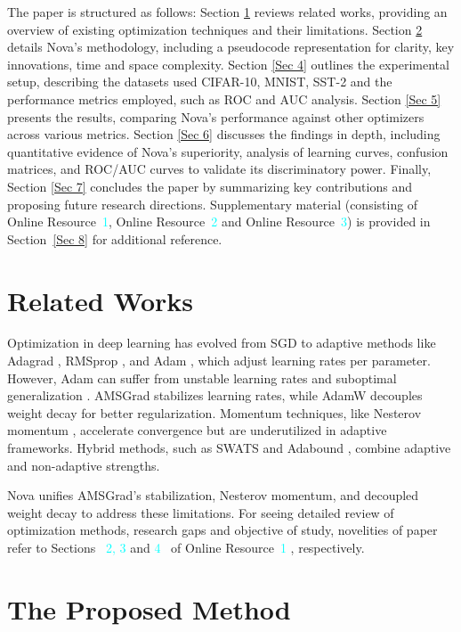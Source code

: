 \documentclass[10pt,twocolumn]{article}
\newcommand{\OnlineRef}[2]{%
  Sections~%
  \textcolor{cyan}{2, 3} and \textcolor{cyan}{4}%
  ~of Online Resource~\textcolor{cyan}{#2}%
}
\begin{document}
The paper is structured as follows: Section \ref{Sec 2} reviews related works, providing an overview of existing optimization techniques and their limitations. Section \ref{Sec 3} details Nova’s methodology, including a pseudocode representation for clarity, key innovations, time and space complexity. Section \ref{Sec 4} outlines the experimental setup, describing the datasets used CIFAR-10, MNIST, SST-2 and the performance metrics employed, such as ROC and AUC analysis. Section \ref{Sec 5} presents the results, comparing Nova’s performance against other optimizers across various metrics. Section \ref{Sec 6} discusses the findings in depth, including quantitative evidence of Nova’s superiority, analysis of learning curves, confusion matrices, and ROC/AUC curves to validate its discriminatory power. Finally, Section \ref{Sec 7} concludes the paper by summarizing key contributions and proposing future research directions. Supplementary material (consisting of Online Resource~\textcolor{cyan}{1},  Online Resource~\textcolor{cyan}{2} and Online Resource~\textcolor{cyan}{3}) is provided in Section~\ref{Sec 8} for additional reference.  
\section{Related Works}
\label{Sec 2}

Optimization in deep learning has evolved from SGD \cite{Robbins1951} to adaptive methods like Adagrad \cite{Duchi2011}, RMSprop \cite{Tieleman2012}, and Adam \cite{Kingma2014}, which adjust learning rates per parameter. However, Adam can suffer from unstable learning rates \cite{Reddi2018} and suboptimal generalization \cite{Wilson2017}. AMSGrad \cite{Reddi2018} stabilizes learning rates, while AdamW \cite{Loshchilov2017} decouples weight decay for better regularization. Momentum techniques, like Nesterov momentum \cite{nesterov1983method}, accelerate convergence but are underutilized in adaptive frameworks. Hybrid methods, such as SWATS \cite{Keskar2017} and Adabound \cite{Luo2019}, combine adaptive and non-adaptive strengths.

Nova unifies AMSGrad’s stabilization, Nesterov momentum, and decoupled weight decay to address these limitations.  For seeing detailed review of optimization methods,  research gaps and objective of study, novelities of paper  refer to \OnlineRef{2, 3 and 4}{1}, respectively.  %

\section{The Proposed Method}\label{Sec 3}
\end{document}
